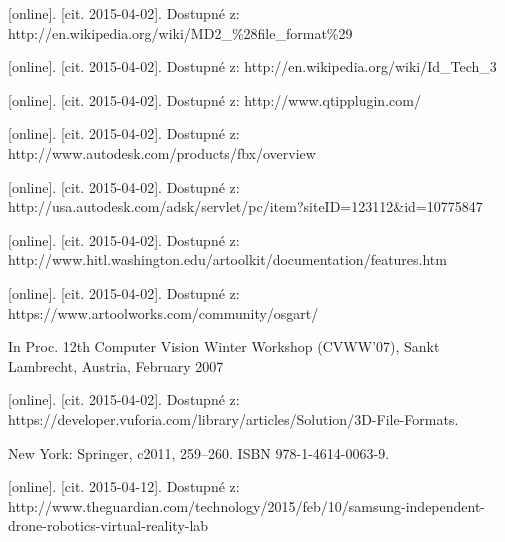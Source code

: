 \documentclass[twoside,12pt]{article}
\begin{document}
\begin{literatura}
{
	 [online]. [cit. 2015-04-02]. Dostupné z: http://en.wikipedia.org/wiki/MD2\_\%28file\_format\%29
}

{
	 [online]. [cit. 2015-04-02]. Dostupné z: http://en.wikipedia.org/wiki/Id\_Tech\_3
}

{
	 [online]. [cit. 2015-04-02]. Dostupné z: http://www.qtipplugin.com/
}

{
	 [online]. [cit. 2015-04-02]. Dostupné z: http://www.autodesk.com/products/fbx/overview
}

{
	 [online]. [cit. 2015-04-02]. Dostupné z: http://usa.autodesk.com/adsk/servlet/pc/item?siteID=123112\&id=10775847
}

{
	 [online]. [cit. 2015-04-02]. Dostupné z: http://www.hitl.washington.edu/artoolkit/documentation/features.htm
}

{
	 [online]. [cit. 2015-04-02]. Dostupné z: https://www.artoolworks.com/community/osgart/
}

{
In Proc. 12th Computer Vision Winter Workshop (CVWW'07), Sankt Lambrecht, Austria, February 2007
}

{
	 [online]. [cit. 2015-04-02]. Dostupné z: https://developer.vuforia.com/library/articles/Solution/3D-File-Formats.
}

{
	 New York: Springer, c2011, 259–260. ISBN 978-1-4614-0063-9.
}
 

{
	[online]. [cit. 2015-04-12]. Dostupné z: http://www.theguardian.com/technology/2015/feb/10/samsung-independent-drone-robotics-virtual-reality-lab
}


\end{literatura}
\end{document}
